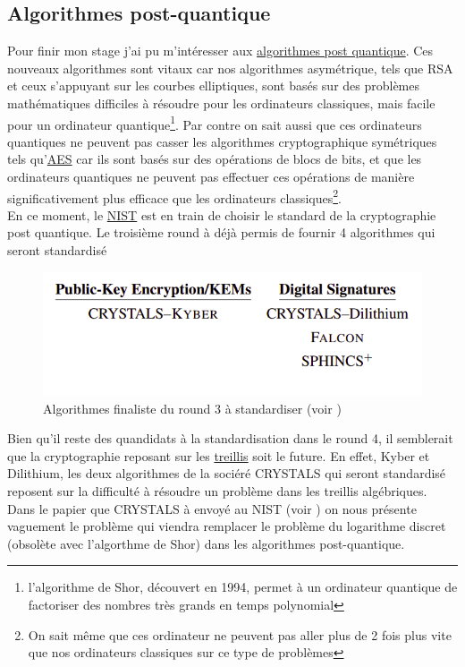 \documentclass[a4paper, 12pt]{article}
\begin{document}
\subsection{Algorithmes post-quantique}
Pour finir mon stage j'ai pu m'intéresser aux \hyperref[postquant]{algorithmes post quantique}. Ces nouveaux algorithmes sont vitaux car nos algorithmes asymétrique, tels que RSA et ceux s'appuyant sur les courbes elliptiques, sont basés sur des problèmes mathématiques difficiles à résoudre pour les ordinateurs classiques, mais facile pour un ordinateur quantique\footnote{l'algorithme de Shor, découvert en 1994, permet à un ordinateur quantique de factoriser des nombres très grands en temps polynomial}. Par contre on sait aussi que ces ordinateurs quantiques ne peuvent pas casser les algorithmes cryptographique symétriques tels qu'\hyperref[AESsec]{AES} car ils sont basés sur des opérations de blocs de bits, et que les ordinateurs quantiques ne peuvent pas effectuer ces opérations de manière significativement plus efficace que les ordinateurs classiques\footnote{On sait même que ces ordinateur ne peuvent pas aller plus de 2 fois plus vite que nos ordinateurs classiques sur ce type de problèmes}. \\

En ce moment, le \hyperref[NIST]{NIST} est en train de choisir le standard de la cryptographie post quantique. Le troisième round à déjà permis de fournir 4 algorithmes qui seront standardisé 
\begin{figure}[h]
	\centering
	\includegraphics[width=.7\textwidth]{img/NISTround3.png}
	\caption{Algorithmes finaliste du round 3 à standardiser (voir \cite{NISTroundtrois})}
	\label{NISTround3}
\end{figure}

Bien qu'il reste des quandidats à la standardisation dans le round 4, il semblerait que la cryptographie reposant sur les \hyperref[treillis]{treillis} soit le future. En effet, Kyber et Dilithium, les deux algorithmes de la sociéré CRYSTALS qui seront standardisé reposent sur la difficulté à résoudre un problème dans les treillis algébriques.\\

Dans le papier que CRYSTALS à envoyé au NIST (voir \cite{cristalslattice}) on nous présente vaguement le problème qui viendra remplacer le problème du logarithme discret (obsolète avec l'algorthme de Shor) dans les algorithmes post-quantique. \\
\end{document}
